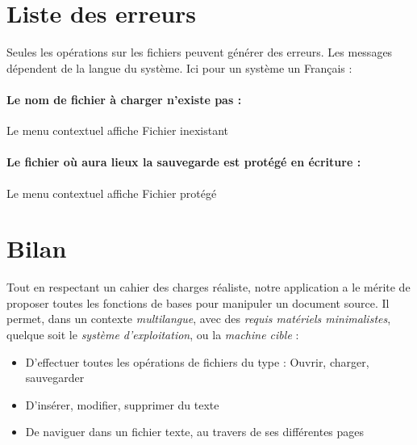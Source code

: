 \section{Liste des erreurs}
Seules les opérations sur les fichiers peuvent générer des erreurs. Les messages dépendent de la langue du système. Ici pour un système un Français :

\paragraph{Le nom de fichier à charger n'existe pas :} Le menu contextuel affiche \og Fichier inexistant\fg
\paragraph{Le fichier où aura lieux la sauvegarde est protégé en écriture :} Le menu contextuel affiche \og Fichier protégé\fg

\section{Bilan}
Tout en respectant un cahier des charges réaliste, notre application a le mérite de proposer toutes les fonctions de bases pour manipuler un document source. Il permet, dans un contexte \emph{multilangue}, avec des \emph{requis matériels minimalistes}, quelque soit le \emph{système d'exploitation}, ou la \emph{machine cible} :
\begin{itemize}
	\item D'effectuer toutes les opérations de fichiers du type : Ouvrir, charger, sauvegarder
	\item D'insérer, modifier, supprimer du texte
	\item De naviguer dans un fichier texte, au travers de ses différentes pages
\end{itemize}



